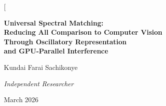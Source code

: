 \documentclass[11pt,twocolumn,a4paper]{article}
\begin{document}
\twocolumn[
\begin{@twocolumnfalse}
\begin{center}

{\LARGE\bfseries Universal Spectral Matching:\\[4pt]
Reducing All Comparison to Computer Vision\\[4pt]
Through Oscillatory Representation\\[4pt]
and GPU-Parallel Interference}

\vspace{12pt}

{\large Kundai Farai Sachikonye}

\vspace{6pt}

{\small\itshape Independent Researcher}

\vspace{6pt}

{\small March 2026}

\vspace{14pt}


\end{center}
\end{@twocolumnfalse}
\end{document}
